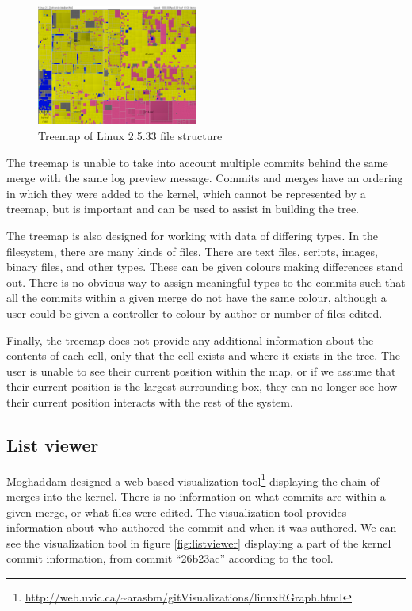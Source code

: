 \documentclass[conference, draftclsnofoot, draft]{IEEEtran}
\begin{document}
\begin{figure}
        \centering
        \includegraphics[width=0.47\textwidth]{figures/kernel-files.png}
        \caption{Treemap of Linux 2.5.33 file structure}
        \label{fig:treemap}
\end{figure}

The treemap is unable to take into account multiple commits behind the same merge
with the same log preview message. Commits and merges have an ordering in which they
were added to the kernel, which cannot be represented by a treemap, but is important
and can be used to assist in building the tree.

The treemap is also designed for working with data of differing types. In the
filesystem, there are many kinds of files. There are text files, scripts, images,
binary files, and other types. These can be given colours making differences stand
out. There is no obvious way to assign meaningful types to the commits such that all
the commits within a given merge do not have the same colour, although a user
could be given a controller to colour by author or number of files edited.

Finally, the treemap does not provide any additional information about the
contents of each cell, only that the cell exists and where it exists in the
tree. The user is unable to see their current position within the map, or if we
assume that their current position is the largest surrounding box, they can
no longer see how their current position interacts with the rest of the
system.



\subsection{List viewer}

Moghaddam designed a web-based visualization
tool\footnote{\url{http://web.uvic.ca/~arasbm/gitVisualizations/linuxRGraph.html}}
displaying the chain of merges into the kernel. There is no information on what
commits are within a given merge, or what files were edited. The visualization
tool provides information about who authored the commit and when it was
authored. We can see the visualization tool in figure \ref{fig:listviewer}
displaying a part of the kernel commit information, from commit ``26b23ac''
according to the tool.
\end{document}
